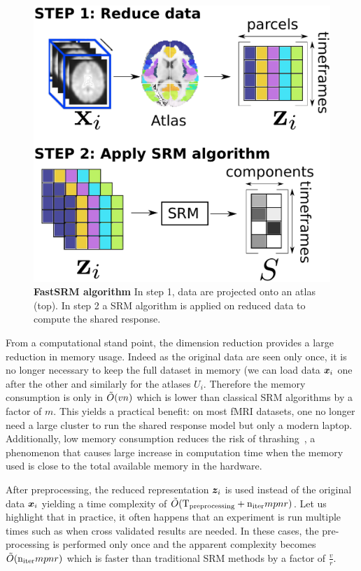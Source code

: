 \begin{figure}
  \centering
  \includegraphics[scale=0.34]{figures/srm/conceptual_figure2.pdf}
  \caption{\textbf{FastSRM algorithm} In step 1, data are projected onto an atlas (top). In step 2 a SRM algorithm is applied on reduced data to compute the shared response.}
  \label{fig:srm:conceptual}
\end{figure}

From a computational stand point, the dimension reduction provides
a large reduction in memory usage. Indeed as the original data are seen only
once, it is no longer necessary to keep the full dataset in memory (we can load
data $\boldsymbol{x}_i$ one after the other and similarly for the atlases $U_i$. Therefore the memory consumption is only in $\tilde{O}(vn)$ which is lower than classical SRM algorithms by a factor of $m$. This yields a practical benefit: on most fMRI datasets, one no longer need a large cluster to run the shared response model but only a modern laptop.
Additionally, low memory consumption reduces the
risk of thrashing~\cite{denning1968thrashing}, a phenomenon that causes large
increase in computation time when the memory used is close to the total available
memory in the hardware.

After preprocessing, the reduced representation $\boldsymbol{z}_i$ is used instead of the
original data $\boldsymbol{x}_i$ yielding a time complexity of $\tilde{O}(
\mathrm{T_{preprocessing}} + \mathrm{n_{iter}} mpnr)$.
Let us highlight that in practice, it often happens that an experiment is run
multiple times such as when cross validated results are needed. In these cases,
the pre-processing is performed only once and the apparent complexity becomes
$\tilde{O}(\mathrm{n_{iter}} mpnr)$ which is faster than traditional SRM methods by
a factor of $\frac{v}{r}$.


